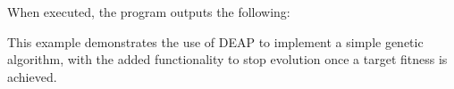 
  When executed, the program outputs the following:


  This example demonstrates the use of DEAP to implement a simple genetic
  algorithm, with the added functionality to stop evolution once a target
  fitness is achieved.

